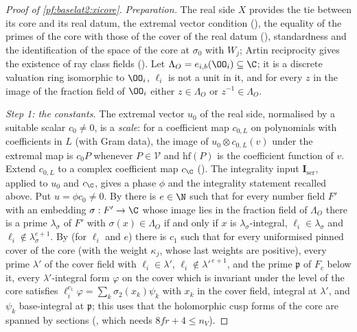 \begin{proof}[Proof of \cref{pf:baselat2:xicore}]
\emph{Preparation.} The real side $X$ provides the tie between its core and its real datum, the extremal
vector condition (), the equality of the primes of the core with those of
the cover of the real datum (), standardness and the
identification of the space of the core at $\sigma_0$ with $W_j$; Artin reciprocity gives the existence of ray
class fields (). Let
$\Lambda_O=e_{i,b}(\OO_i)\subseteq\C$; it is a discrete valuation ring isomorphic to $\OO_i$, $\ell_i$ is not a unit in it, and
for every $z$ in the image of the fraction field of $\OO_i$ either $z\in\Lambda_O$ or $z^{-1}\in\Lambda_O$.

\emph{Step 1: the constants.} The extremal vector $u_0$ of the real side, normalised by a suitable scalar
$c_0\neq0$, is a \emph{scale}: for a coefficient map $c_{0,L}$ on polynomials with coefficients in $L$ (with Gram data),
the image of $u_0\otimes c_{0,L}(v)$ under the extremal map is $c_0P$ whenever $P\in\mathcal V$ and $\mathrm{hf}(P)$ is the
coefficient function of $v$. Extend $c_{0,L}$ to a complex coefficient map $c_{\C}$
(). The integrality input $\mathbf I_{\mathrm{ser}}$, applied to $u_0$ and $c_{\C}$,
gives a phase $\phi$ and the integrality statement recalled above. Put $u=\phi c_0\neq0$. By
 there is $e\in\N$ such that for every number field $F'$ with an
embedding $\sigma:F'\to\C$ whose image lies in the fraction field of $\Lambda_O$ there is a prime $\lambda_\sigma$ of $F'$ with
$\sigma(x)\in\Lambda_O$ if and only if $x$ is $\lambda_\sigma$-integral, $\ell_i\in\lambda_\sigma$ and $\ell_i\notin\lambda_\sigma^{e+1}$. By
 (for $\ell_i$ and $e$) there is $c_1$ such that for every
uniformised pinned cover of the core (with the weight $\kappa_j$, whose last weights are positive), every prime
$\lambda'$ of the cover field with $\ell_i\in\lambda'$, $\ell_i\notin\lambda'^{\,e+1}$, and the prime $\mathfrak p$ of $F_c$ below it, every
$\lambda'$-integral form $\varphi$ on the cover which is invariant under the level of the core satisfies
$\ell_i^{c_1}\varphi=\sum_k\sigma_2(x_k)\psi_k$ with $x_k$ in the cover field, integral at $\lambda'$, and $\psi_k$ base-integral at
$\mathfrak p$; this uses that the holomorphic cusp forms of the core are spanned by sections
(, which needs $8fr+4\le n_V$).


\end{proof}
